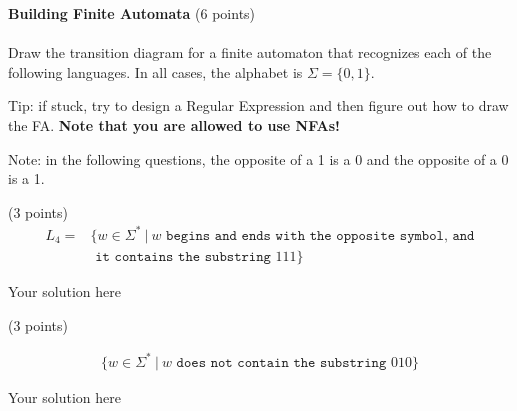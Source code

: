 \documentclass[12pt]{article}
\newenvironment{question}[2][Question]{\begin{trivlist}
\item[\hskip \labelsep {\bfseries #1}\hskip \labelsep {\bfseries #2.}]}{\end{trivlist}}
\newenvironment{solution}[1][Solution:]{\begin{trivlist}
\item[\hskip \labelsep {\bfseries #1}\hskip \labelsep {\bfseries}]\color{blue}}{\end{trivlist}}
\begin{document}
\begin{question}{4}\textbf{Building Finite Automata} (6 points)\\\\
Draw the transition diagram for a finite automaton that recognizes each of the following languages. In all cases, the alphabet is $\Sigma = \{0,1\}$.

Tip: if stuck, try to design a Regular Expression and then figure out how to draw the FA. \textbf{Note that you are allowed to use NFAs!}

Note: in the following questions, the opposite of a 1 is a 0 and the opposite of a 0 is a 1.
\begin{enumerate}[(a)]
    \item (3 points)
        \begin{align*}
            L_4 = &\{ w \in \Sigma^* \ | \ w \texttt{ begins and ends with the opposite symbol, and} \\ 
            &\texttt{ it contains the substring } 111 \}            
        \end{align*}
        

    \begin{solution}
       Your solution here
    \end{solution}
	
	\item (3 points) 

 \begin{align*}
            \{ w \in \Sigma^* \ | \ w \texttt{  does not contain the substring } 010 \}
        \end{align*}

    \begin{solution}
       Your solution here
    \end{solution}

\end{enumerate}
\end{question}



\clearpage
\end{document}
